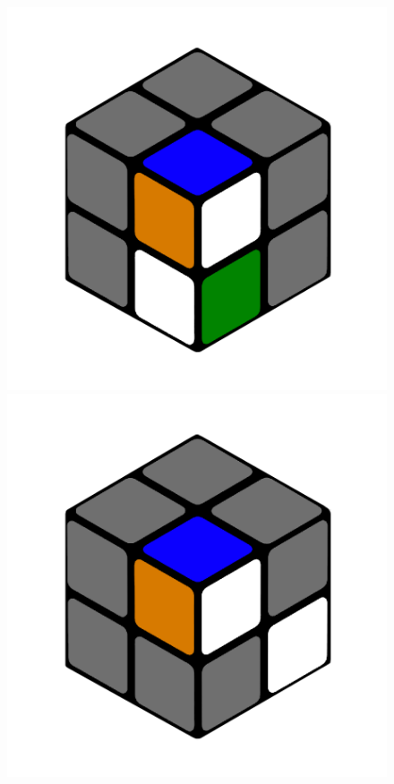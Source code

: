 \documentclass[12pt,a4paper, usenames, dvipsnames]{article}
\begin{document}
\begin{figure}[h]
\includegraphics[scale=0.1]{e1_s2_s2_s.png}
\includegraphics[scale=0.1]{e1_s2_s3_s.png}

\end{figure}
\end{document}
